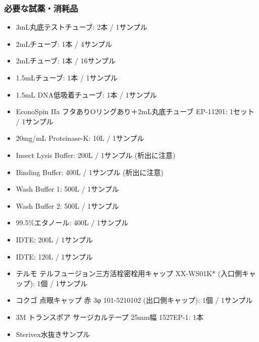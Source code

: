 \documentclass[titlepage,10pt,a4paper,uplatex]{jsbook}
\begin{document}
\subsubsection{必要な試薬・消耗品}
\begin{itemize}
\item 3mL丸底テストチューブ: 2本 / 1サンプル
\item 2mLチューブ: 1本 / 4サンプル
\item 2mLチューブ: 1本 / 16サンプル
\item 1.5mLチューブ: 1本 / 1サンプル
\item 1.5mL DNA低吸着チューブ: 1本 / 1サンプル
\item EconoSpin IIa フタありOリングあり＋2mL丸底チューブ EP-11201: 1セット / 1サンプル
\item 20mg/mL Proteinase-K: 10{\textmu}L / 1サンプル
\item Insect Lysis Buffer: 200{\textmu}L / 1サンプル (析出に注意)
\item Binding Buffer: 400{\textmu}L / 1サンプル (析出に注意)
\item Wash Buffer 1: 500{\textmu}L / 1サンプル
\item Wash Buffer 2: 500{\textmu}L / 1サンプル
\item 99.5\%エタノール: 400{\textmu}L / 1サンプル
\item IDTE: 200{\textmu}L / 1サンプル
\item IDTE: 120{\textmu}L / 1サンプル
\item テルモ テルフュージョン三方活栓密栓用キャップ XX-WS01K* (入口側キャップ): 1個 / 1サンプル
\item コクゴ 点眼キャップ 赤 3φ 101-5210102 (出口側キャップ): 1個 / 1サンプル
\item 3M トランスポア サージカルテープ 25mm幅 1527EP-1: 1本
\item Sterivex水抜きサンプル
\end{itemize}
\end{document}
